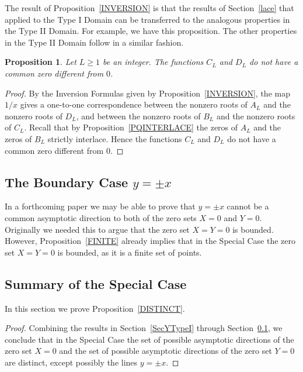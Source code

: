 \documentclass{article}
\newtheorem{prop}[thm]{Proposition}
\theoremstyle{remark}
\numberwithin{equation}{section}
\begin{document}
The result of Proposition~\ref{INVERSION} is that the results of Section~\ref{lace} that applied to the Type I Domain can be transferred to the analogous properties in the Type II Domain.  For example, we have this proposition.  The other properties in the Type II Domain follow in a similar fashion.

\begin{prop}\label{CDNOTCOMMON}
Let $L \geq 1$ be an integer. The functions $C_L$ and $D_L$ do not have a common zero different from $0$.
\end{prop}

\begin{proof}  By the Inversion Formulas given by Proposition~\ref{INVERSION}, the map $1/x$ gives a one-to-one correspondence between the nonzero roots of $A_L$ and the nonzero roots of $D_L$, and 
between the nonzero roots of $B_L$ and the nonzero roots of $C_L$. Recall that by Proposition~\ref{PQINTERLACE} the zeros of  $A_L$ and the zeros of $B_L$ strictly interlace. Hence the  functions $C_L$ and $D_L$ do not have a common zero different from $0$.
\end{proof}

\subsection{The Boundary Case $y = \pm x$} \label{Boundary}
In a forthcoming paper we may be able to prove that $y = \pm x$ cannot be a common asymptotic direction to both of the zero sets $X=0$ and $Y=0$. 
Originally we needed this to argue that the zero set $X=Y=0$ is bounded. However, Proposition~\ref{FINITE} already implies that
in the Special Case the zero set $X=Y=0$ is bounded, as it is a finite set of points.

\subsection{Summary of the Special Case}\label{SpecialSum}

In this section we prove Proposition~\ref{DISTINCT}.

\begin{proof} Combining the results in Section~\ref{SecYTypeI} through Section~\ref{Boundary}, we conclude that in the Special Case the set of possible 
asymptotic directions of the zero set $X=0$ and the set of possible asymptotic directions of the zero set $Y=0$ 
are distinct, except possibly the lines $y = \pm x$. 
\end{proof}
\end{document}

